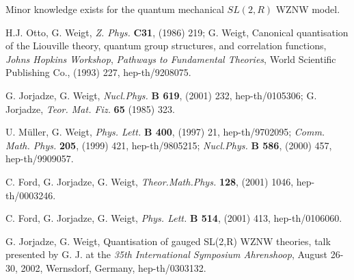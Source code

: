 \documentclass[a4paper,12]{article}
\begin{document}
Minor  knowledge exists for the quantum mechanical
$SL(2,R)$ WZNW model.

\begin{thebibliography}{xx}
\frenchspacing

 H.J. Otto, G. Weigt, {\it Z. Phys.} {\bf C31}, (1986)
   219; G. Weigt, Canonical quantisation of the Liouville theory, quantum
   group structures, and correlation functions, {\it Johns Hopkins
   Workshop}, {\it Pathways to Fundamental Theories}, World Scientific
   Publishing Co., (1993) 227, hep-th/9208075.
  
 G. Jorjadze, G. Weigt, {\it Nucl.Phys.} {\bf B 619},
   (2001) 232, hep-th/0105306; G. Jorjadze, 
   {\it Teor. Mat. Fiz.}  {\bf 65} (1985) 323.
  
 U. M\"uller, G. Weigt, {\it Phys. Lett.} {\bf B 400},
   (1997) 21, hep-th/9702095; {\it Comm. Math. Phys.} {\bf 205}, 
   (1999) 421, hep-th/9805215; 
    {\it Nucl.Phys.} {\bf B 586}, (2000) 457, hep-th/9909057.
  
 C. Ford, G. Jorjadze, G. Weigt, 
    {\it Theor.Math.Phys.} {\bf 128}, (2001) 1046, hep-th/0003246.
  
 C. Ford, G. Jorjadze, G. Weigt, 
   {\it Phys. Lett.} { \bf B 514}, (2001) 413, hep-th/0106060.
  
 G. Jorjadze, G. Weigt, Quantisation of gauged SL(2,R) WZNW 
  theories, talk presented by G. J. at the {\it 35th International Symposium
  Ahrenshoop}, August 26-30, 2002, Wernsdorf, Germany, hep-th/0303132.

\end{thebibliography}
\end{document}
